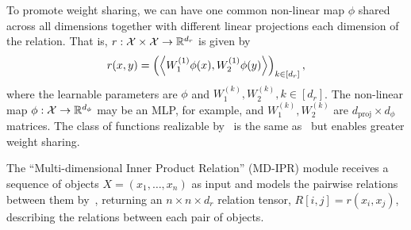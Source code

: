 To promote weight sharing, we can have one common non-linear map $\phi$ shared across all dimensions together with different linear projections each dimension of the relation. That is, $r: {\mathcal{X}} \times {\mathcal{X}} \to \mathbb{R}^{d_r}$ is given by
\begin{equation}\label{eq:relation_function_lin_proj}
    r(x, y) = \left(\left \langle W_1^{(1)}\phi(x), W_2^{(1)}\phi(y) \right\rangle\right)_{k \in [d_r]},
\end{equation}
where the learnable parameters are $\phi$ and $W_1^{(k)}, W_2^{(k)}, k \in [d_r]$. The non-linear map $\phi: {\mathcal{X}} \to \mathbb{R}^{d_\phi}$ may be an MLP, for example, and $W_1^{(k)}, W_2^{(k)}$ are $d_{\mathrm{proj}} \times d_\phi$ matrices. The class of functions realizable by~ is the same as~ but enables greater weight sharing.

The ``Multi-dimensional Inner Product Relation'' (MD-IPR) module receives a sequence of objects $X = (x_1, \ldots, x_n)$ as input and models the pairwise relations between them by~, returning an $n \times n \times d_r$ relation tensor, $R[i,j] = r(x_i, x_j)$, describing the relations between each pair of objects.

% 